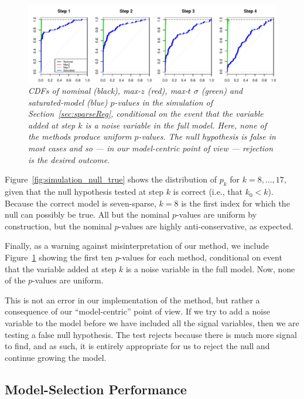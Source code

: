 \documentclass{article}
\begin{document}
\begin{figure}[h]
  \centering
  \includegraphics[width=1\textwidth]{figs/simulation_snr_5_alpha_05_noise_var.pdf}
  \caption{\em CDFs of nominal (black), max-$z$ (red), max-$t$ $\sigma$ (green) and  saturated-model (blue) $p$-values in the simulation of Section~\ref{sec:sparseReg}, conditional on the event that the variable added at step $k$ is a noise variable in the full model. Here, none of the methods produce uniform $p$-values. The null hypothesis is false in most cases and so --- in our model-centric point of view --- rejection is the desired outcome.}
  \label{fig:simulation_noise_var}
\end{figure}

Figure~\ref{fig:simulation_null_true} shows the distribution of $p_k$ for $k = 8, \ldots, 17$, given that the null hypothesis tested at step $k$ is correct (i.e., that $k_0< k$). Because the correct model is seven-sparse, $k=8$ is the first index for which the null can possibly be true. All but the nominal $p$-values are uniform by construction, but the nominal $p$-values are highly anti-conservative, as expected.

Finally, as a warning against misinterpretation of our method, we include Figure~\ref{fig:simulation_noise_var} showing the first ten $p$-values for each method, conditional on event that the variable added at step $k$ is a noise variable in the full model. Now, none of the $p$-values are uniform. 

This is not an error in our implementation of the method, but rather a consequence of our ``model-centric'' point of view. If we try to add a noise variable to the model before we have included all the signal variables, then we are testing a false null hypothesis. The test rejects because there is much more signal to find, and as such, it is entirely appropriate for us to reject the null and continue growing the model.

\subsection{Model-Selection Performance}
\end{document}
